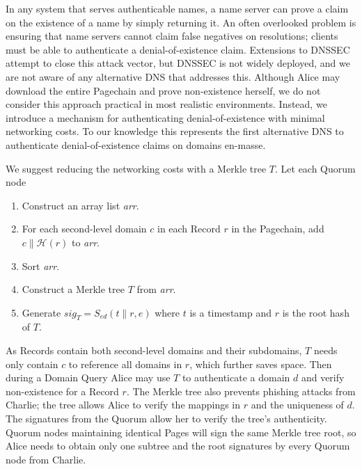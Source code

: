 \documentclass[USenglish,oneside,twocolumn]{article}
\newcommand*\concat{\mathbin{\|}}
\begin{document}

In any system that serves authenticable names, a name server can prove a claim on the existence of a name by simply returning it. An often overlooked problem is ensuring that name servers cannot claim false negatives on resolutions; clients must be able to authenticate a denial-of-existence claim. Extensions to DNSSEC attempt to close this attack vector, but DNSSEC is not widely deployed, and we are not aware of any alternative DNS that addresses this. Although Alice may download the entire Pagechain and prove non-existence herself, we do not consider this approach practical in most realistic environments. Instead, we introduce a mechanism for authenticating denial-of-existence with minimal networking costs. To our knowledge this represents the first alternative DNS to authenticate denial-of-existence claims on domains en-masse.

We suggest reducing the networking costs with a Merkle tree \cite{merkle1988digital} $ T $. Let each Quorum node

\begin{enumerate}
	\item Construct an array list \emph{arr}.
	\item For each second-level domain $ c $ in each Record $ r $ in the Pagechain, add $ c \concat \mathcal{H}(r) $ to \emph{arr}.
	\item Sort \emph{arr}.
	\item Construct a Merkle tree $ T $ from \emph{arr}.
	\item Generate $ \mathit{sig}_{T} = S_{\mathit{ed}}(t \concat r, e) $ where $ t $ is a timestamp and $ r $ is the root hash of $ T $.
\end{enumerate}

As Records contain both second-level domains and their subdomains, $ T $ needs only contain $ c $ to reference all domains in $ r $, which further saves space. Then during a Domain Query Alice may use $ T $ to authenticate a domain $ d $ and verify non-existence for a Record $ r $. The Merkle tree also prevents phishing attacks from Charlie; the tree allows Alice to verify the mappings in $ r $ and the uniqueness of $ d $. The signatures from the Quorum allow her to verify the tree's authenticity. Quorum nodes maintaining identical Pages will sign the same Merkle tree root, so Alice needs to obtain only one subtree and the root signatures by every Quorum node from Charlie.
\end{document}
